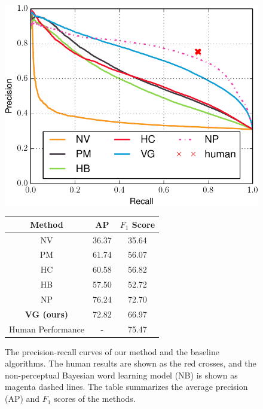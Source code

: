 \begin{figure}
    \centering
    \parbox{0.35\textwidth}{
    \includegraphics[width=1\linewidth]{figs/vcl/pr_curve.pdf}}\hspace{0.05\textwidth}%
    \parbox{0.4\textwidth}{
        \small
        \begin{tabular}{c|cc}
            \hline\hline
            Method & AP & $F_1$ Score \\
            \hline
            NV & 36.37 & 35.64 \\
            PM & 61.74 & 56.07 \\
            HC & 60.58 & 56.82 \\
            HB & 57.50 & 52.72 \\
            NP & 76.24 & 72.70 \\
            {\bfseries VG (ours)} & 72.82 & 66.97 \\
            \hline
            Human Performance & - & 75.47 \\
            \hline
        \end{tabular}
    }\vspace{-0.1in}
    \caption{The precision-recall curves of our method and the baseline algorithms. The human results are shown as the red crosses, and the non-perceptual Bayesian word learning model (NB) is shown as magenta dashed lines. The table summarizes the average precision (AP) and $F_1$ scores of the methods.}\label{fig:prcurve}\vspace{-0.15in}
\end{figure}

